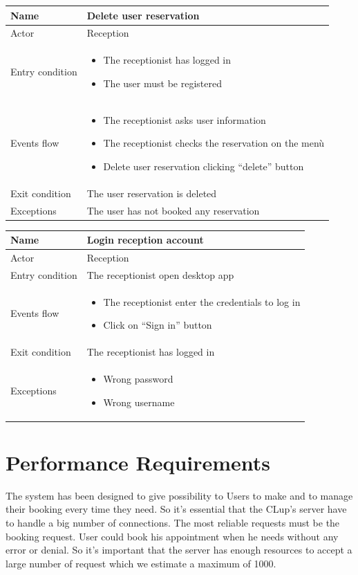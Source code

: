 \begin{tabular}{|p{5cm} | p{7cm} | }
	\hline
	Name & Delete user reservation \\
	\hline
	Actor & Reception \\
	\hline
	Entry condition &
	\begin{itemize}
		\item The receptionist has logged in 
		\item The user must be registered
	\end{itemize} \\
	\hline
	Events flow & 
	\begin{itemize}
		\item The receptionist asks user information
		\item The receptionist checks the reservation on the menù
		\item Delete user reservation clicking “delete” button
	\end{itemize} \\
	\hline
	Exit condition &
	The user reservation is deleted \\
	\hline 
	Exceptions & 
	The user has not booked any reservation \\
	\hline
\end{tabular}

\begin{tabular}{|p{5cm} | p{7cm} | }
	\hline
	Name & Login reception account \\
	\hline
	Actor & Reception \\
	\hline
	Entry condition &
	The receptionist open desktop app  \\
	\hline
	Events flow & 
	\begin{itemize}
		\item The receptionist enter the credentials to log in 
		\item Click on “Sign in” button
	\end{itemize} \\
	\hline
	Exit condition &
	The receptionist has logged in \\
	\hline 
	Exceptions & 
	\begin{itemize}
		\item Wrong password
		\item Wrong username
	\end{itemize} \\
	\hline
\end{tabular}


\section{Performance Requirements}
The system has been designed to give possibility to Users to make and to manage their booking every time they need. So it's essential that the CLup's server have to handle a big number of connections. The most reliable requests must be the booking request. User could book his appointment when he needs without any error or denial. So it's important that the server has enough resources to accept a large number of request which we estimate a maximum of 1000.




